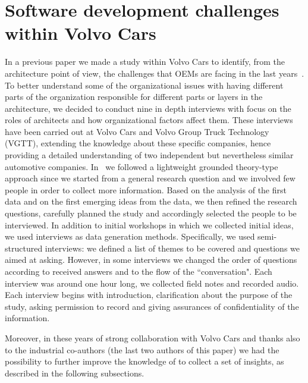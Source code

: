 \section{Software development challenges within Volvo Cars}\label{sec:lessonsLearned}

In a previous paper we made a study within Volvo Cars to identify, from the architecture point of view, the challenges that OEMs are facing in the last years~\cite{WICSA2015}. 
To better understand some of the
organizational issues with having different parts of the organization responsible for different parts or layers in the architecture, we decided to conduct nine in depth interviews with
focus on the roles of architects and how organizational factors affect them.
These interviews have been carried out at Volvo Cars  and Volvo Group Truck Technology
(VGTT), extending the knowledge about these specific companies, hence providing a detailed understanding of two independent but nevertheless similar automotive companies. %
In~\cite{WICSA2015} we 
followed a lightweight grounded theory-type approach since we started from a general research question and we involved few people in order to collect more information. Based on the analysis of the first data and on the first emerging ideas from the data, we then refined the research questions, carefully planned the study and accordingly selected the people to be interviewed. 
In addition to initial workshops in which we collected initial ideas, we used interviews as data generation methods. Specifically, we used semi-structured interviews: we defined a list of themes to be covered and questions we aimed at asking. However, in some interviews we changed the order of questions according to received answers and to the flow of the ``conversation". 
Each interview was around one hour long, we collected field notes and recorded audio. Each interview begins with introduction, clarification about the purpose of the study, asking permission to record and giving assurances of confidentiality of the information.  

Moreover, in these years of strong collaboration with Volvo Cars and thanks also to the industrial co-authors (the last two authors of this paper) we had the possibility to further improve the knowledge of to collect a set of insights, as described in the following subsections.

